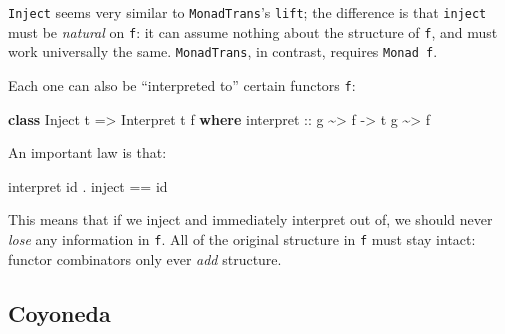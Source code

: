 \documentclass[]{article}
\newenvironment{Shaded}{}{}
\newcommand{\DataTypeTok}[1]{\textcolor[rgb]{0.56,0.13,0.00}{#1}}
\newcommand{\FunctionTok}[1]{\textcolor[rgb]{0.02,0.16,0.49}{#1}}
\newcommand{\KeywordTok}[1]{\textcolor[rgb]{0.00,0.44,0.13}{\textbf{#1}}}
\newcommand{\NormalTok}[1]{#1}
\newcommand{\OperatorTok}[1]{\textcolor[rgb]{0.40,0.40,0.40}{#1}}
\newcommand{\OtherTok}[1]{\textcolor[rgb]{0.00,0.44,0.13}{#1}}
\begin{document}
\texttt{Inject} seems very similar to \texttt{MonadTrans}'s \texttt{lift}; the
difference is that \texttt{inject} must be \emph{natural} on \texttt{f}: it can
assume nothing about the structure of \texttt{f}, and must work universally the
same. \texttt{MonadTrans}, in contrast, requires \texttt{Monad\ f}.

Each one can also be ``interpreted to'' certain functors \texttt{f}:

\begin{Shaded}
\begin{Highlighting}[]
\KeywordTok{class} \DataTypeTok{Inject}\NormalTok{ t }\OtherTok{=>} \DataTypeTok{Interpret}\NormalTok{ t f }\KeywordTok{where}
\NormalTok{    interpret}
\OtherTok{        ::}\NormalTok{ g }\OperatorTok{\textasciitilde{}>}\NormalTok{ f}
        \OtherTok{{-}>}\NormalTok{ t g }\OperatorTok{\textasciitilde{}>}\NormalTok{ f}
\end{Highlighting}
\end{Shaded}

An important law is that:

\begin{Shaded}
\begin{Highlighting}[]
\NormalTok{interpret }\FunctionTok{id} \OperatorTok{.}\NormalTok{ inject }\OperatorTok{==} \FunctionTok{id}
\end{Highlighting}
\end{Shaded}

This means that if we inject and immediately interpret out of, we should never
\emph{lose} any information in \texttt{f}. All of the original structure in
\texttt{f} must stay intact: functor combinators only ever \emph{add} structure.

\hypertarget{coyoneda}{%
\subsection{Coyoneda}\label{coyoneda}}
\end{document}
